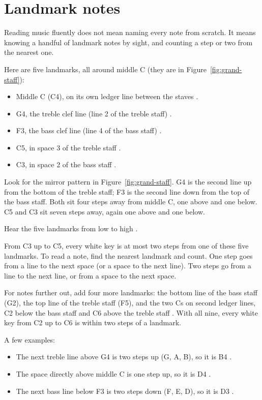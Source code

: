 \section{Landmark notes}

Reading music fluently does not mean naming every note from scratch. It means knowing a handful of landmark notes by sight, and counting a step or two from the nearest one.

Here are five landmarks, all around middle C (they are in Figure~\ref{fig:grand-staff}):
\begin{itemize}
  \item Middle C (C4), on its own ledger line between the staves .
  \item G4, the treble clef line (line 2 of the treble staff) .
  \item F3, the bass clef line (line 4 of the bass staff) .
  \item C5, in space 3 of the treble staff .
  \item C3, in space 2 of the bass staff .
\end{itemize}

Look for the mirror pattern in Figure~\ref{fig:grand-staff}. G4 is the second line up from the bottom of the treble staff; F3 is the second line down from the top of the bass staff. Both sit four steps away from middle C, one above and one below. C5 and C3 sit seven steps away, again one above and one below.

Hear the five landmarks from low to high .

From C3 up to C5, every white key is at most two steps from one of these five landmarks. To read a note, find the nearest landmark and count. One step goes from a line to the next space (or a space to the next line). Two steps go from a line to the next line, or from a space to the next space.

For notes further out, add four more landmarks: the bottom line of the bass staff (G2), the top line of the treble staff (F5), and the two Cs on second ledger lines, C2 below the bass staff and C6 above the treble staff . With all nine, every white key from C2 up to C6 is within two steps of a landmark.

A few examples:
\begin{itemize}
  \item The next treble line above G4 is two steps up (G, A, B), so it is B4 .
  \item The space directly above middle C is one step up, so it is D4 .
  \item The next bass line below F3 is two steps down (F, E, D), so it is D3 .
\end{itemize}


